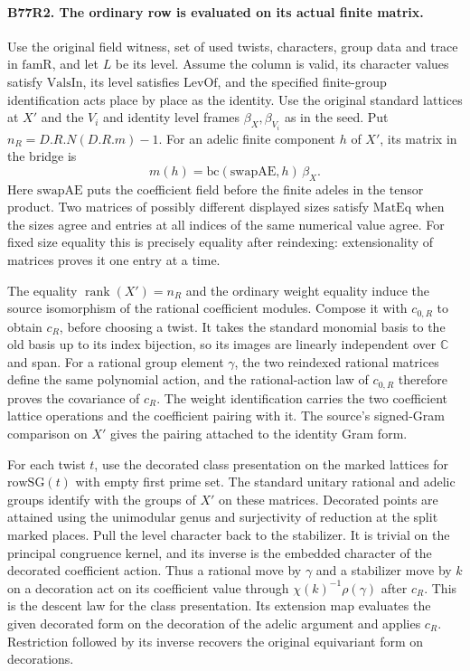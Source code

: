 \paragraph{B77R2. The ordinary row is evaluated on its actual finite matrix.}
Use the original field witness, set of used twists, characters,
group data and trace in $\mathrm{famR}$, and let $L$ be its level.
Assume the column is valid, its character values satisfy
$\mathrm{ValsIn}$, its level satisfies $\mathrm{LevOf}$, and the
specified finite-group identification acts place by place as the
identity. Use the original standard lattices at $X'$ and the $V_i$
and identity level frames $\beta_X,\beta_{V_i}$ as in the seed.
Put $n_R=D.R.N(D.R.m)-1$. For an adelic finite component $h$ of
$X'$, its matrix in the bridge is
\[
 m(h)=\mathrm{bc}(\mathrm{swapAE},h)\,\beta_X.
\]
Here $\mathrm{swapAE}$ puts the coefficient field before the
finite adeles in the tensor product. Two matrices of possibly
different displayed sizes satisfy $\mathrm{MatEq}$ when the sizes
agree and entries at all indices of the same numerical value agree.
For fixed size equality this is precisely equality after reindexing:
extensionality of matrices proves it one entry at a time.

The equality $\operatorname{rank}(X')=n_R$ and the ordinary
weight equality induce the source isomorphism of the rational
coefficient modules. Compose it with $c_{0,R}$ to obtain $c_R$,
before choosing a twist. It takes the standard monomial basis
to the old basis up to its index bijection, so its images are
linearly independent over $\mathbb C$ and span. For a rational
group element $\gamma$, the two reindexed rational matrices
define the same polynomial action, and the rational-action law of
$c_{0,R}$ therefore proves the covariance of $c_R$. The
weight identification carries the two coefficient lattice
operations and the coefficient pairing with it. The source's
signed-Gram comparison on $X'$ gives the pairing attached to
the identity Gram form.

For each twist $t$, use the decorated class presentation on the
marked lattices for $\mathrm{rowSG}(t)$ with empty first prime set.
The standard unitary rational and adelic groups identify with the
groups of $X'$ on these matrices. Decorated points are attained
using the unimodular genus and surjectivity of reduction at the
split marked places. Pull the level character back to the stabilizer.
It is trivial on the principal congruence kernel, and its inverse
is the embedded character of the decorated coefficient action.
Thus a rational move by $\gamma$ and a stabilizer move by $k$
on a decoration act on its coefficient value through
$\chi(k)^{-1}\rho(\gamma)$ after $c_R$. This is the descent law
for the class presentation. Its extension map evaluates the
given decorated form on the decoration of the adelic argument
and applies $c_R$. Restriction followed by its inverse recovers
the original equivariant form on decorations.

